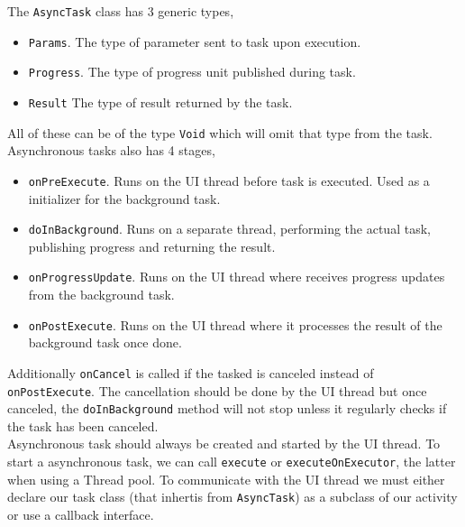 The \texttt{AsyncTask} class has 3 generic types,
\begin{itemize}
\item \texttt{Params}. The type of parameter sent to task upon execution.
\item \texttt{Progress}. The type of progress unit published during task.
\item \texttt{Result} The type of result returned by the task.
\end{itemize}
All of these can be of the type \texttt{Void} which will omit that type from the task. Asynchronous tasks also has 4 stages,
\begin{itemize}
\item \texttt{onPreExecute}. Runs on the UI thread before task is executed. Used as a initializer for the background task.
\item \texttt{doInBackground}. Runs on a separate thread, performing the actual task, publishing progress and returning the result.
\item \texttt{onProgressUpdate}. Runs on the UI thread where receives progress updates from the background task.
\item \texttt{onPostExecute}. Runs on the UI thread where it processes the result of the background task once done.
\end{itemize}
Additionally \texttt{onCancel} is called if the tasked is canceled instead of \texttt{onPostExecute}. The cancellation should be done by the UI thread but once canceled, the \texttt{doInBackground} method will not stop unless it regularly checks if the task has been canceled.\\

Asynchronous task should always be created and started by the UI thread. To start a asynchronous task, we can call \texttt{execute} or \texttt{executeOnExecutor}, the latter when using a Thread pool. To communicate with the UI thread we must either declare our task class (that inhertis from \texttt{AsyncTask}) as a subclass of our activity or use a callback interface.


